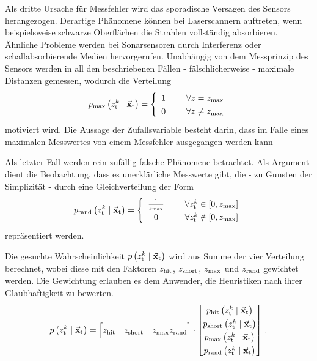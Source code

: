 Als dritte Ursache für Messfehler wird das sporadische Versagen des Sensors herangezogen. Derartige Phänomene können bei Laserscannern auftreten, wenn beispielsweise schwarze Oberflächen die Strahlen vollständig absorbieren. Ähnliche Probleme werden bei Sonarsensoren durch Interferenz oder schallabsorbierende Medien hervorgerufen. Unabhängig von dem Messprinzip des Sensors werden in all den beschriebenen Fällen - fälschlicherweise - maximale Distanzen gemessen, wodurch die Verteilung
\begin{equation}
p\idx{max}\left(z^k\idx{t} \mCond \mVec{x}\idx{t}\right) = \left\{ \begin{array}{cl}
1 & \hspace{5mm} \forall z = z\idx{max} \\
0 & \hspace{5mm} \forall z  \neq z\idx{max}
\end{array}\right.
\end{equation}
motiviert wird. Die Aussage der Zufallsvariable besteht darin, dass im Falle eines maximalen Messwertes von einem Messfehler ausgegangen werden kann

Als letzter  Fall werden rein zufällig falsche Phänomene betrachtet. Als Argument dient die Beobachtung, dass es unerklärliche Messwerte gibt, die - zu Gunsten der Simplizität - durch eine Gleichverteilung der Form
\begin{equation}
\renewcommand*{\arraystretch}{1.3}
p\idx{rand}\left( z^k\idx{t} \mCond \mVec{x}\idx{t}\right) = \left\{ \begin{array}{cl}
\frac{1}{z\idx{max}} & \hspace{5mm} \forall z^k\idx{t} \in \left[0, z\idx{max}\right] 
\\
0 & \hspace{5mm} \forall z^k\idx{t} \notin \left[0, z\idx{max}\right]
\end{array} \right.
\end{equation}
repräsentiert werden. 

Die gesuchte Wahrscheinlichkeit $p\left({z^k_{\text{t}}} \hspace{1mm} \vert \hspace{1mm} {\vec{\mathbf{x}}_{\text{t}}}\right)$ wird aus Summe der vier Verteilung berechnet, wobei diese mit den Faktoren $z_{\text{hit}}$, $z_{\text{short}}$, $z_{\text{max}}$ und $z_{\text{rand}}$ gewichtet werden. Die Gewichtung erlauben es dem Anwender, die Heuristiken nach ihrer Glaubhaftigkeit zu bewerten.
\begin{equation}
\condP{z^k\idx{t}}{\mVec{x}\idx{t}} = \begin{bmatrix} z\idx{hit} & z\idx{short} & z\idx{max} z\idx{rand} \end{bmatrix} \cdot \begin{bmatrix}
p\idx{hit}\left( z^{k}\idx{t} \mCond \mVec{x}\idx{t} \right) \\
p\idx{short}\left( z^k\idx{t} \mCond \mVec{x}\idx{t} \right) \\
p\idx{max}\left(z^k\idx{t} \mCond \mVec{x}\idx{t}\right) \\
p\idx{rand}\left( z^k\idx{t} \mCond \mVec{x}\idx{t}\right)
\end{bmatrix}\,.
\end{equation}